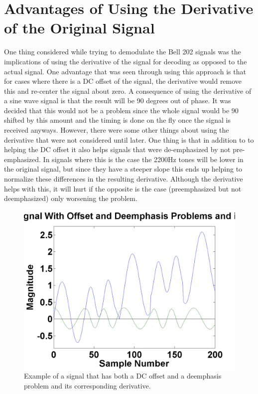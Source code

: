 \section{Advantages of Using the Derivative of the Original Signal}
One thing considered while trying to demodulate the Bell 202 signals was the implications of using the derivative of the signal for decoding as opposed to the actual signal. One advantage that was seen through using this approach is that for cases where there is a DC offset of the signal, the derivative would remove this and re-center the signal about zero. A consequence of using the derivative of a sine wave signal is that the result will be 90 degrees out of phase. It was decided that this would not be a problem since the whole signal would be 90 shifted by this amount and the timing is done on the fly once the signal is received anyways. However, there were some other things about using the derivative that were not considered until later. One thing is that in addition to to helping the DC offset it also helps signals that were de-emphasized by not pre-emphasized. In signals where this is the case the 2200Hz tones will be lower in the original signal, but since they have a steeper slope this ends up helping to normalize these differences in the resulting derivative. Although the derivative helps with this, it will hurt if the opposite is the case (preemphasized but not deemphasized) only worsening the problem.
\begin{figure}
  \centering
	\includegraphics[width=0.75\linewidth]{images/OriginalSignalWithOffsetandDeemphasisProblemsanditsDerivative.png} 
	\caption{Example of a signal that has both a DC offset and a deemphasis problem and its corresponding derivative.}
\end{figure}

